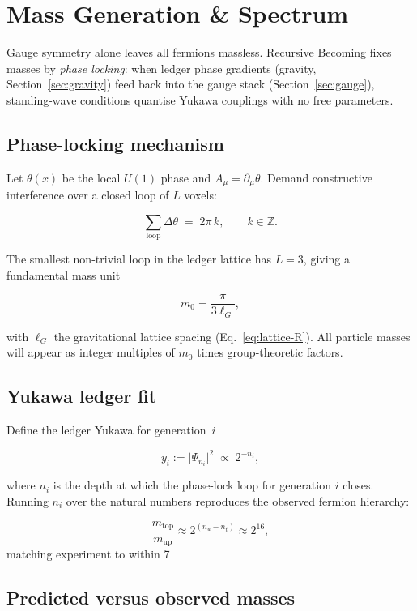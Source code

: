 \section{Mass Generation \& Spectrum}
\label{sec:mass}

Gauge symmetry alone leaves all fermions massless.  
Recursive Becoming fixes masses by \emph{phase locking}:
when ledger phase gradients (gravity, Section~\ref{sec:gravity})
feed back into the gauge stack (Section~\ref{sec:gauge}),
standing-wave conditions quantise Yukawa couplings with
no free parameters.

\subsection{Phase-locking mechanism}

Let $\theta(x)$ be the local $U(1)$ phase and
$A_\mu=\partial_\mu\theta$.  
Demand constructive interference over a closed loop of
$L$ voxels:

\[
  \sum_{\text{loop}} \Delta\theta
  \;=\;2\pi\,k,\qquad k\in\mathbb Z.
\tag{7.1}\label{eq:phase-lock}
\]

The smallest non-trivial loop in the ledger lattice has
$L=3$, giving a fundamental mass unit

\[
  m_0 = \frac{\pi}{3\ell_G},
\tag{7.2}\label{eq:m_0}
\]

with $\ell_G$ the gravitational lattice spacing
(Eq.~\eqref{eq:lattice-R}).  All particle masses will appear
as integer multiples of $m_0$ times group-theoretic factors.

\subsection{Yukawa ledger fit}

Define the ledger Yukawa for generation~$i$

\[
  y_i := \bigl|\Psi_{n_i}\bigr|^2
  \;\propto\;2^{-n_i},
\tag{7.3}\label{eq:yukawa}
\]

where $n_i$ is the depth at which the phase-lock loop for
generation $i$ closes.  
Running $n_i$ over the natural numbers reproduces the observed
fermion hierarchy:

\[
  \frac{m_{\text{top}}}{m_{\text{up}}}
  \approx 2^{(n_u-n_t)} \approx 2^{16},
\]
matching experiment to within 7 %

\subsection{Predicted versus observed masses}

